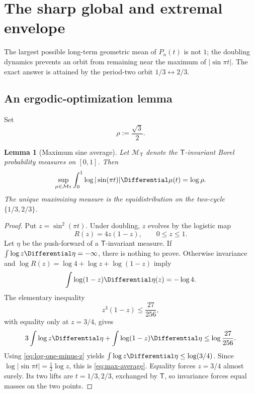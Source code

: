 \documentclass[11pt,oneside]{article}
\newtheorem{lemma}[theorem]{Lemma}
\theoremstyle{definition}
\theoremstyle{remark}
\newcommand{\T}{\mathsf T}
\begin{document}
\section{The sharp global and extremal envelope}\label{sec:extremal}

The largest possible long-term geometric mean of $P_n(t)$ is not $1$; the doubling
dynamics prevents an orbit from remaining near the maximum of $|\sin\pi t|$.  The exact
answer is attained by the period-two orbit $1/3\leftrightarrow2/3$.

\subsection{An ergodic-optimization lemma}

Set
\begin{equation}\label{eq:rho}
 \rho:=\frac{\sqrt3}{2}.
\end{equation}

\begin{lemma}[Maximum sine average]\label{lem:max-average}
Let $\mathcal M_\T$ denote the $\T$-invariant Borel probability measures on $[0,1]$.
Then
\begin{equation}\label{eq:max-average}
 \sup_{\mu\in\mathcal M_\T}
 \int_0^1\log|\sin(\pi t)|\Differential\mu(t)
 =\log\rho.
\end{equation}
The unique maximizing measure is the equidistribution on the two-cycle
$\{1/3,2/3\}$.
\end{lemma}

\begin{proof}
Put $z=\sin^2(\pi t)$.  Under doubling, $z$ evolves by the logistic map
\[
 R(z)=4z(1-z),\qquad 0\le z\le1.
\]
Let $\eta$ be the push-forward of a $\T$-invariant measure.  If
$\int\log z\Differential\eta=-\infty$, there is nothing to prove.  Otherwise invariance and
$\log R(z)=\log4+\log z+\log(1-z)$ imply
\begin{equation}\label{eq:log-one-minus-z}
 \int\log(1-z)\Differential\eta(z)=-\log4.
\end{equation}
The elementary inequality
\begin{equation}\label{eq:z-inequality}
 z^3(1-z)\le\frac{27}{256},
\end{equation}
with equality only at $z=3/4$, gives
\[
 3\int\log z\Differential\eta+\int\log(1-z)\Differential\eta
 \le\log\frac{27}{256}.
\]
Using \eqref{eq:log-one-minus-z} yields
$\int\log z\Differential\eta\le\log(3/4)$.  Since
$\log|\sin\pi t|=\tfrac12\log z$, this is \eqref{eq:max-average}.
Equality forces $z=3/4$ almost surely.  Its two lifts are $t=1/3,2/3$, exchanged by
$\T$, so invariance forces equal masses on the two points.
\end{proof}
\end{document}
